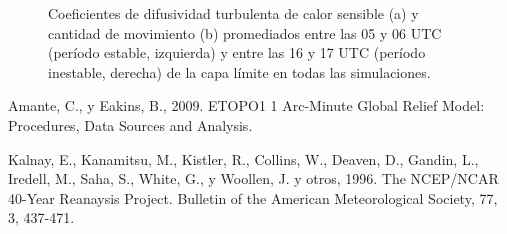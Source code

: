 \documentclass[12pt,spanish,oneside, a4paper]{book}
\begin{document}
\begin{figure}

{\centering {}\newline{}

}

\caption{Coeficientes de difusividad turbulenta de calor sensible (a) y cantidad de movimiento (b) promediados entre las 05 y 06 UTC (período estable, izquierda) y entre las 16 y 17 UTC (período inestable, derecha) de la capa límite en todas las simulaciones.  \label{k-ulke-wrf}}\label{fig:k_ulke_wrf}
\end{figure}

\hypertarget{refs}{}
\hypertarget{ref-Amante2009}{}
Amante, C., y Eakins, B., 2009. ETOPO1 1 Arc-Minute Global Relief Model:
Procedures, Data Sources and Analysis.

\hypertarget{ref-Kalnay1996}{}
Kalnay, E., Kanamitsu, M., Kistler, R., Collins, W., Deaven, D., Gandin,
L., Iredell, M., Saha, S., White, G., y Woollen, J. y otros, 1996. The
NCEP/NCAR 40-Year Reanaysis Project. Bulletin of the American
Meteorological Society, 77, 3, 437-471.
\end{document}
